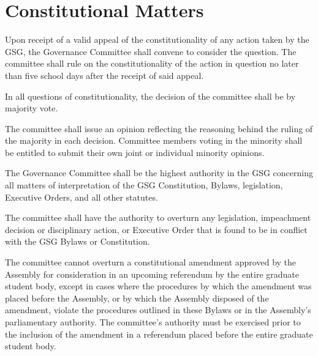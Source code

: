 \section{Constitutional Matters}
\begin{bylaws-number}
  \item Upon receipt of a valid appeal of the constitutionality of any action taken by the GSG, the Governance Committee shall convene to consider the question. The committee shall rule on the constitutionality of the action in question no later than five school days after the receipt of said appeal.
  \item In all questions of constitutionality, the decision of the committee shall be by majority vote.
  \item The committee shall issue an opinion reflecting the reasoning behind the ruling of the majority in each decision. Committee members voting in the minority shall be entitled to submit their own joint or individual minority opinions.
  \item The Governance Committee shall be the highest authority in the GSG concerning all matters of interpretation of the GSG Constitution, Bylaws, legislation, Executive Orders, and all other statutes.
  \item The committee shall have the authority to overturn any legislation, impeachment decision or disciplinary action, or Executive Order that is found to be in conflict with the GSG Bylaws or Constitution.
  \item The committee cannot overturn a constitutional amendment approved by the Assembly for consideration in an upcoming referendum by the entire graduate student body, except in cases where the procedures by which the amendment was placed before the Assembly, or by which the Assembly disposed of the amendment, violate the procedures outlined in these Bylaws or in the Assembly’s parliamentary authority. The committee’s authority must be exercised prior to the inclusion of the amendment in a referendum placed before the entire graduate student body.
\end{bylaws-number}
